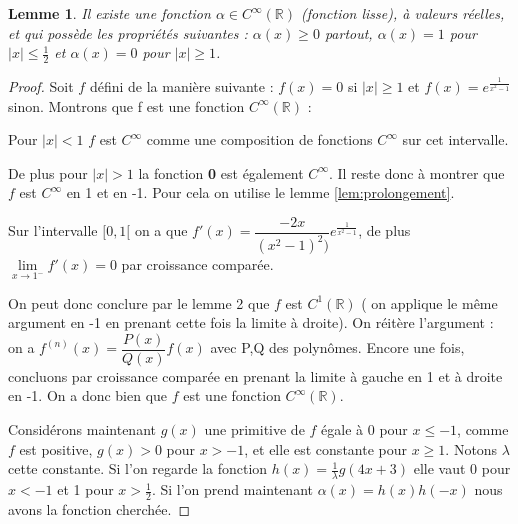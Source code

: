 \documentclass[12pt,a4paper]{amsart}
\newtheorem{lem}[thm]{\bf Lemme}
\begin{document}
\begin{lem}\rm Il existe une fonction $\alpha \in C^{\infty}(\mathbb{R})$ (fonction lisse), à valeurs réelles, et qui possède les propriétés suivantes : $\alpha(x)\geq 0$ partout, $\alpha(x)=1 $ pour $|x|\leq \frac{1}{2}$ et $\alpha(x)=0 $ pour $|x|\geq 1$.
\end{lem}

\begin{proof}
Soit $ f $ défini de la manière suivante : $f(x)=0$ si $|x|\geq 1$ et $f(x)=e^{\frac{1}{x^{2}-1}}$ sinon.
Montrons que f est une fonction $C^{\infty}(\mathbb{R})$ :

 Pour $|x|<1$ $f$ est $C^{\infty}$ comme une composition de fonctions $C^{\infty}$ sur cet intervalle.
 
  De plus pour $|x|>1$ la fonction \textbf{0} est également $C^{\infty}$.
   Il reste donc à montrer que $f$ est $C^{\infty}$ en 1 et en -1. Pour cela on utilise le lemme \ref{lem:prolongement}. 
   
   Sur l'intervalle $[0,1[$ on a que $f'(x) = \dfrac{-2x}{(x^{2}-1)^{2})} e^{\frac{1}{x^{2}-1}}$, de plus 
$\lim\limits_{x \rightarrow 1^{-}} f'(x)=0$ par croissance comparée. 

On peut donc conclure par le lemme 2 que $f$ est $C^{1}(\mathbb{R})$ ( on applique le même argument en -1 en prenant cette fois la limite à droite).
 On réitère l'argument : on a $f^{(n)}(x) = \dfrac{P(x)}{Q(x)} f(x)$ avec P,Q des polynômes. Encore une fois, concluons par croissance comparée en prenant la limite à gauche en 1 et à droite en -1. On a donc bien que $f$ est une fonction $C^{\infty}(\mathbb{R})$. 

Considérons maintenant $g(x)$ une primitive de $f$ égale à 0 pour $x\leq-1$, comme $f$ est positive, $g(x)>0$ pour $x>-1$, et elle est constante pour $x\geq 1$. Notons $\lambda$ cette constante. Si l'on regarde la fonction $h(x)= \frac{1}{\lambda} g(4x+3)$ elle vaut 0 pour $x<-1$ et 1 pour $x>\frac{1}{2}$. Si l'on prend maintenant $\alpha(x)= h(x)h(-x)$ nous avons la fonction cherchée.
\end{proof}
\end{document}
